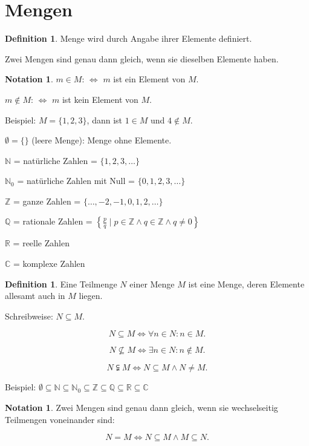 \documentclass[a4paper,11pt,oneside]{scrartcl}
\theoremstyle{plain}
\theoremstyle{definition}
\newtheorem{definition}[satz]{Definition}
\newtheorem{notation}[satz]{Notation}
\begin{document}
\section{Mengen}
\begin{definition}
    \item Menge wird durch Angabe ihrer Elemente definiert.
    \item Zwei Mengen sind genau dann gleich, wenn sie dieselben Elemente haben.
\end{definition}
\begin{notation}
    \item $m \in M$: $\Leftrightarrow$ $m$ ist ein Element von $M$.
    \item $m \notin M$: $\Leftrightarrow$ $m$ ist kein Element von $M$.
    \item Beispiel: $M = \{1,2,3\}$, dann ist $1 \in M$ und $4 \notin M$.
    \item $\emptyset = \{\}$ (leere Menge): Menge ohne Elemente.
    \item $\mathbb{N}$ = natürliche Zahlen = $\{1,2,3,\ldots\}$
    \item $\mathbb{N}_0$ = natürliche Zahlen mit Null = $\{0,1,2,3,\ldots\}$
    \item $\mathbb{Z}$ = ganze Zahlen = $\{\ldots,-2,-1,0,1,2,\ldots\}$
    \item $\mathbb{Q}$ = rationale Zahlen = $\left\{\frac{p}{q} \mid p \in \mathbb{Z} \land q \in \mathbb{Z} \land q \neq 0 \right\}$
    \item $\mathbb{R}$ = reelle Zahlen
    \item $\mathbb{C}$ = komplexe Zahlen
\end{notation}
\begin{definition}
    \item Eine Teilmenge $N$ einer Menge $M$ ist eine Menge, deren Elemente allesamt auch in $M$ liegen.
    \item Schreibweise: $N \subseteq M$.
    \item $$N \subseteq M \Leftrightarrow \forall n \in N: n \in M.$$
    \item $$N \nsubseteq M \Leftrightarrow \exists n \in N: n \notin M.$$
    \item $$N \subsetneqq M \Leftrightarrow N \subseteq M \land N \neq M.$$
    \item Beispiel: $\emptyset \subseteq \mathbb{N} \subseteq \mathbb{N}_0 \subseteq \mathbb{Z} \subseteq \mathbb{Q} \subseteq \mathbb{R} \subseteq \mathbb{C}$
\end{definition}
\begin{notation}
    \item Zwei Mengen sind genau dann gleich, wenn sie wechselseitig Teilmengen voneinander sind:
    \item $$N = M \Leftrightarrow N \subseteq M \land M \subseteq N.$$
\end{notation}

\end{document}
